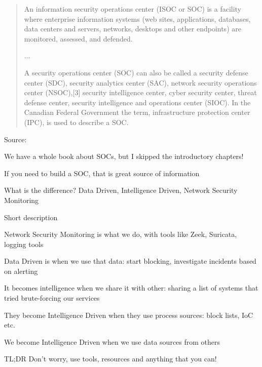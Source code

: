 \documentclass[Screen16to9,17pt]{foils}
\begin{document}


\begin{quote}
An information security operations center (ISOC or SOC) is a facility where enterprise information systems (web sites, applications, databases, data centers and servers, networks, desktops and other endpoints) are monitored, assessed, and defended.

...

A security operations center (SOC) can also be called a security defense center (SDC), security analytics center (SAC), network security operations center (NSOC),[3] security intelligence center, cyber security center, threat defense center, security intelligence and operations center (SIOC). In the Canadian Federal Government the term, infrastructure protection center (IPC), is used to describe a SOC.
\end{quote}
Source: 

\begin{list2}
  \item We have a whole book about SOCs, but I skipped the introductory chapters!
  \item If you need to build a SOC, that is great source of information
\end{list2}



What is the difference? Data Driven, Intelligence Driven, Network Security Monitoring

Short description
\begin{list2}
\item Network Security Monitoring is what we do, with tools like Zeek, Suricata, logging tools
\item Data Driven is when we use that data: start blocking, investigate incidents based on alerting
\item It becomes intelligence when we share it with other: sharing a list of systems that tried brute-forcing our services
\item They become Intelligence Driven when they use process sources: block lists, IoC etc.
\item We become Intelligence Driven when we use data sources from others
\end{list2}

TL;DR Don't worry, use tools, resources and anything that you can!
\end{document}
